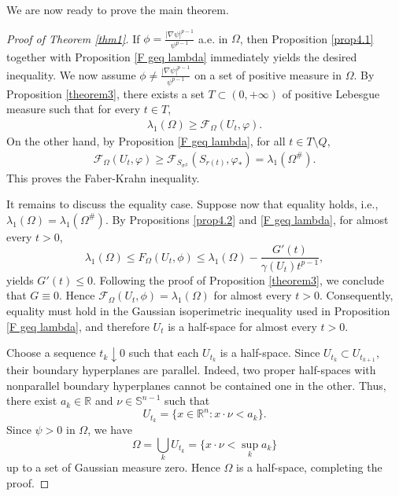 \documentclass[11pt,leqno]{amsart}
\def\l{\lambda}
\def\R{\mathbb{R}}
\numberwithin{equation}{section}
\begin{document}
We are now ready to prove the main theorem.
\begin{proof}[Proof of Theorem \ref{thm1}]
If $ \phi =\frac{|\nabla\psi|^{p-1}}{\psi^{p-1}}$ a.e.  in $\Omega$, then Proposition \ref{prop4.1}  together with Proposition \ref{F geq lambda} immediately yields the desired inequality. We now assume
 $ \phi \neq \frac{|\nabla\psi|^{p-1}}{\psi^{p-1}} $
 on a set of positive measure in $\Omega$.
By Proposition \ref{theorem3},  there exists a set  $T\subset (0,+\infty)$ of positive Lebesgue measure such that for every $t\in T$,
    \begin{align*}
        \lambda_{1}(\Omega)\geq \mathcal{F}_\Omega(U_t, \varphi).
    \end{align*}
On the other hand, by Proposition \ref{F geq lambda},  for all $t\in T\setminus Q$,
    \begin{align*}
     \mathcal{F}_\Omega(U_t, \varphi)\geq \mathcal{F}_{S_{\sigma^\#}}(S_{r(t)}, \varphi_*) = \l_1(\Omega^\#).
    \end{align*}
This proves the Faber-Krahn inequality.

It remains to discuss the equality case.  Suppose now that equality holds, i.e., $ \lambda_1(\Omega)=\lambda_1(\Omega^\#)$.
By Propositions \ref{prop4.2} and \ref{F geq lambda}, for almost every \(t>0\),
$$ \lambda_1(\Omega) \le F_\Omega(U_t,\phi) \le \lambda_1(\Omega) -\frac{G'(t)}{\gamma(U_t)t^{p-1}}, $$
yields \(G'(t)\le0\). Following the proof of Proposition  \ref{theorem3},  we conclude that  $G\equiv0$. Hence
$\mathcal F_\Omega(U_t,\phi)=\lambda_1(\Omega) $
for almost every \(t>0\). Consequently, equality must hold in the Gaussian isoperimetric inequality used in Proposition \ref{F geq lambda}, and therefore  $U_t$ is a half-space for almost every $t>0$.

Choose a sequence $t_k\downarrow 0$ such that each $U_{t_k}$ is a half-space. Since $U_{t_k}\subset U_{t_{k+1}}$, their boundary hyperplanes are parallel. Indeed, two proper half-spaces with nonparallel boundary hyperplanes cannot be contained one in the other.  Thus, there exist $a_k\in \R$ and $\nu\in\mathbb S^{n-1}$ such that
$$ U_{t_k}=\{x\in \R^n: x\cdot\nu<a_k\}. $$
Since \(\psi>0\) in \(\Omega\), we have
$$ \Omega=\bigcup_k U_{t_k} =\{x\cdot\nu<\sup_k a_k\} $$
up to a set of Gaussian measure zero. Hence \(\Omega\) is a half-space, completing the proof.

\end{proof}
 
	
\end{document}
